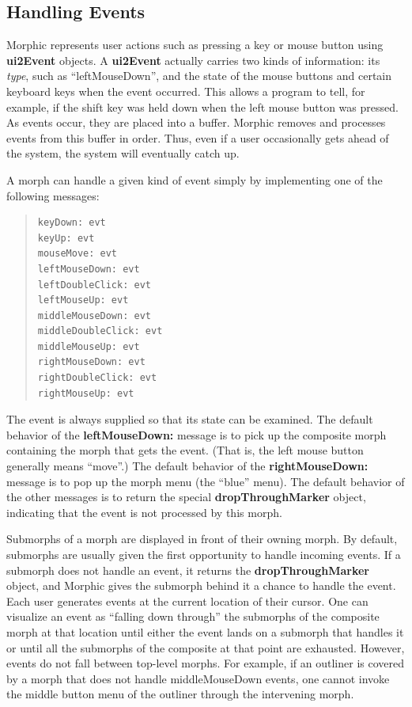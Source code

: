 \documentclass[letterpaper,10pt,english]{sphinxmanual}
\begin{document}
\subsection{Handling Events}
\label{morphic:handling-events}
Morphic represents user actions such as pressing a key or mouse button using \textbf{ui2Event} objects. A \textbf{ui2Event} actually carries two kinds of information: its \emph{type}, such as ``leftMouseDown'', and the state of the mouse buttons and certain keyboard keys when the event occurred. This allows a program to tell, for example, if the shift key was held down when the left mouse button was pressed. As events occur, they are placed into a buffer. Morphic removes and processes events from this buffer in order. Thus, even if a user occasionally gets ahead of the system, the system will eventually catch up.

A morph can handle a given kind of event simply by implementing one of the following messages:
\begin{quote}

\begin{Verbatim}[commandchars=\\\{\}]
keyDown: evt
keyUp: evt
mouseMove: evt
leftMouseDown: evt
leftDoubleClick: evt
leftMouseUp: evt
middleMouseDown: evt
middleDoubleClick: evt
middleMouseUp: evt
rightMouseDown: evt
rightDoubleClick: evt
rightMouseUp: evt
\end{Verbatim}
\end{quote}

The event is always supplied so that its state can be examined. The default behavior of the \textbf{leftMouseDown:} message is to pick up the composite morph containing the morph that gets the event. (That is, the left mouse button generally means ``move''.) The default behavior of the \textbf{rightMouseDown:} message is to pop up the morph menu (the ``blue'' menu). The default behavior of the other messages is to return the special \textbf{dropThroughMarker} object, indicating that the event is not processed by this morph.

Submorphs of a morph are displayed in front of their owning morph. By default, submorphs are usually given the first opportunity to handle incoming events. If a submorph does not handle an event, it returns the \textbf{dropThroughMarker} object, and Morphic gives the submorph behind it a chance to handle the event. Each user generates events at the current location of their cursor. One can visualize an event as ``falling down through'' the submorphs of the composite morph at that location until either the event lands on a submorph that handles it or until all the submorphs of the composite at that point are exhausted. However, events do not fall between top-level morphs. For example, if an outliner is covered by a morph that does not handle middleMouseDown events, one cannot invoke the middle button menu of the outliner through the intervening morph.
\end{document}
